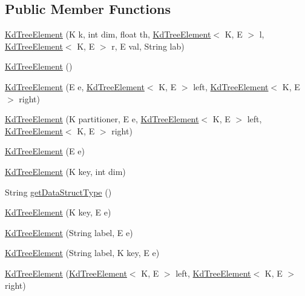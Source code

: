 \subsection*{Public Member Functions}
\begin{DoxyCompactItemize}
\item 
\hyperlink{classbridges_1_1base_1_1_kd_tree_element_a6acdec52089792d20747c10f56139217}{Kd\+Tree\+Element} (K k, int dim, float th, \hyperlink{classbridges_1_1base_1_1_kd_tree_element}{Kd\+Tree\+Element}$<$ K, E $>$ l, \hyperlink{classbridges_1_1base_1_1_kd_tree_element}{Kd\+Tree\+Element}$<$ K, E $>$ r, E val, String lab)
\item 
\hyperlink{classbridges_1_1base_1_1_kd_tree_element_a11cb855f1a151714ee24901a9e91e0da}{Kd\+Tree\+Element} ()
\item 
\hyperlink{classbridges_1_1base_1_1_kd_tree_element_a1db51371824c570a937aa2a78a6cc744}{Kd\+Tree\+Element} (E e, \hyperlink{classbridges_1_1base_1_1_kd_tree_element}{Kd\+Tree\+Element}$<$ K, E $>$ left, \hyperlink{classbridges_1_1base_1_1_kd_tree_element}{Kd\+Tree\+Element}$<$ K, E $>$ right)
\item 
\hyperlink{classbridges_1_1base_1_1_kd_tree_element_a0cab061e295118291d83b40129bcdab6}{Kd\+Tree\+Element} (K partitioner, E e, \hyperlink{classbridges_1_1base_1_1_kd_tree_element}{Kd\+Tree\+Element}$<$ K, E $>$ left, \hyperlink{classbridges_1_1base_1_1_kd_tree_element}{Kd\+Tree\+Element}$<$ K, E $>$ right)
\item 
\hyperlink{classbridges_1_1base_1_1_kd_tree_element_a671342818955bc2c49b326251fde8a1b}{Kd\+Tree\+Element} (E e)
\item 
\hyperlink{classbridges_1_1base_1_1_kd_tree_element_a438fde369fff7d1c34e2007db0e07239}{Kd\+Tree\+Element} (K key, int dim)
\item 
String \hyperlink{classbridges_1_1base_1_1_kd_tree_element_a56b98bd1f3e1e5c0c37519c4b3cf5ba2}{get\+Data\+Struct\+Type} ()
\item 
\hyperlink{classbridges_1_1base_1_1_kd_tree_element_a0ee0c961255e89e18529a5c951db53d9}{Kd\+Tree\+Element} (K key, E e)
\item 
\hyperlink{classbridges_1_1base_1_1_kd_tree_element_a74c3ed00a266215c716ebc945b8d1a69}{Kd\+Tree\+Element} (String label, E e)
\item 
\hyperlink{classbridges_1_1base_1_1_kd_tree_element_ad2c3a73929648e6afce54536790d94c9}{Kd\+Tree\+Element} (String label, K key, E e)
\item 
\hyperlink{classbridges_1_1base_1_1_kd_tree_element_ad8cd8e37105af65a6ae06e743be9aebe}{Kd\+Tree\+Element} (\hyperlink{classbridges_1_1base_1_1_kd_tree_element}{Kd\+Tree\+Element}$<$ K, E $>$ left, \hyperlink{classbridges_1_1base_1_1_kd_tree_element}{Kd\+Tree\+Element}$<$ K, E $>$ right)

\end{DoxyCompactItemize}
